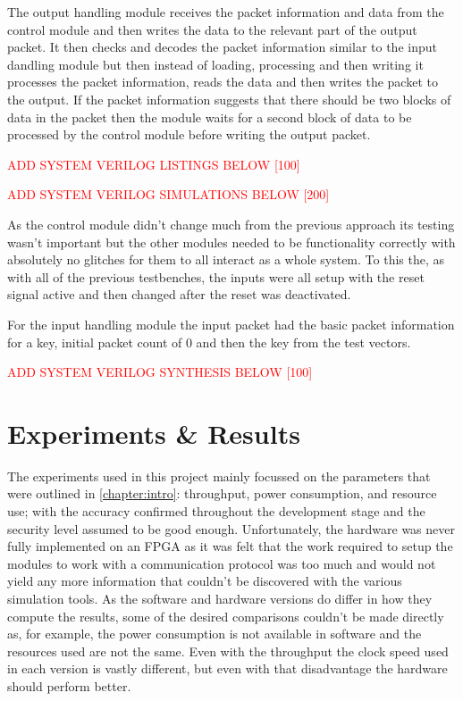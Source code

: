 \documentclass[12pt,twoside,a4paper]{report}
\begin{document}
	The output handling module receives the packet information and data from the control module and then writes the data to the relevant part of the output packet. It then checks and decodes the packet information similar to the input dandling module but then instead of loading, processing and then writing it processes the packet information, reads the data and then writes the packet to the output. If the packet information suggests that there should be two blocks of data in the packet then the module waits for a second block of data to be processed by the control module before writing the output packet.
    
	\textcolor{red}{ADD SYSTEM VERILOG LISTINGS BELOW [100]}
    
	\textcolor{red}{ADD SYSTEM VERILOG SIMULATIONS BELOW [200]}
	
	As the control module didn't change much from the previous approach its testing wasn't important but the other modules needed to be functionality correctly with absolutely no glitches for them to all interact as a whole system. To this the, as with all of the previous testbenches, the inputs were all setup with the reset signal active and then changed after the reset was deactivated.

	For the input handling module the input packet had the basic packet information for a key, initial packet count of $0$ and then the key from the test vectors.

	\textcolor{red}{ADD SYSTEM VERILOG SYNTHESIS BELOW [100]}

	\chapter{Experiments \& Results}
	\label{chapter:RESULT}
	
	The experiments used in this project mainly focussed on the parameters that were outlined in \autoref{chapter:intro}: throughput, power consumption, and resource use; with the accuracy confirmed throughout the development stage and the security level assumed to be good enough. Unfortunately, the hardware was never fully implemented on an FPGA as it was felt that the work required to setup the modules to work with a communication protocol was too much and would not yield any more information that couldn't be discovered  with the various simulation tools. As the software and hardware versions do differ in how they compute the results, some of the desired comparisons couldn't be made directly as, for example, the power consumption is not available in software and the resources used are not the same. Even with the throughput the clock speed used in each version is vastly different, but even with that disadvantage the hardware should perform better.
	
\end{document}
